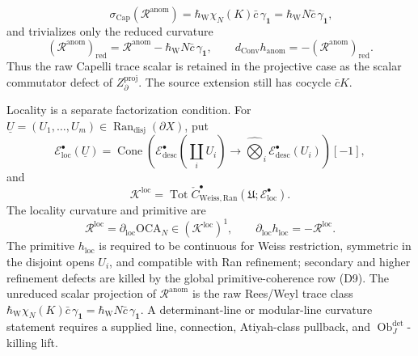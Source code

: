 \begin{defn}
\begin{enumerate}[label=\textup{(D\arabic*)}]
\[      \qquad
      \sigma_{\mathrm{Cap}}(\mathcal R^{\mathrm{anom}})
      =
      \hbar_{\mathrm{W}}\chi_N(K)\bar c\,\gamma_{\mathbf1}
      =\hbar_{\mathrm{W}}N\bar c\,\gamma_{\mathbf1},
    \]
    and trivializes only the reduced curvature
    \[
      (\mathcal R^{\mathrm{anom}})_{\mathrm{red}}
      =
      \mathcal R^{\mathrm{anom}}
      -\hbar_{\mathrm{W}}N\bar c\,\gamma_{\mathbf1},
      \qquad
      d_{\mathrm{Conv}}h_{\mathrm{anom}}
      =
      -(\mathcal R^{\mathrm{anom}})_{\mathrm{red}}.
    \]
    Thus the raw Capelli trace scalar is retained in the projective case
    as the scalar commutator defect of \(Z_\partial^{\mathrm{proj}}\).
    The source extension still has cocycle \(\bar cK\).

    Locality is a separate factorization condition.  For
    \(\underline U=(U_1,\ldots,U_m)\in
    \operatorname{Ran}_{\mathrm{disj}}(\partial X)\), put
    \[
      \mathcal E^\bullet_{\mathrm{loc}}(\underline U)
      =
      \operatorname{Cone}\!\left(
      \mathcal E^\bullet_{\mathrm{desc}}(\coprod_iU_i)
      \longrightarrow
      \widehat\bigotimes_i
      \mathcal E^\bullet_{\mathrm{desc}}(U_i)\right)[-1],
    \]
    and
    \[
      \mathcal K^{\mathrm{loc}}
      =
      \operatorname{Tot}\check C^\bullet_{\mathrm{Weiss,Ran}}
      (\mathfrak U;\mathcal E^\bullet_{\mathrm{loc}}).
    \]
    The locality curvature and primitive are
    \[
      \mathcal R^{\mathrm{loc}}
      =
      \partial_{\mathrm{loc}}\mathrm{OCA}_N\in
      (\mathcal K^{\mathrm{loc}})^1,\qquad
      \partial_{\mathrm{loc}}h_{\mathrm{loc}}
      =
      -\mathcal R^{\mathrm{loc}}.
    \]
    The primitive \(h_{\mathrm{loc}}\) is required to be continuous for
    Weiss restriction, symmetric in the disjoint opens \(U_i\), and
    compatible with Ran refinement; secondary and higher refinement
    defects are killed by the global primitive-coherence row
    \textup{(D9)}.  The unreduced scalar projection of
    \(\mathcal R^{\mathrm{anom}}\) is the raw Rees/Weyl trace class
    \(\hbar_{\mathrm{W}}\chi_N(K)\bar c\,\gamma_{\mathbf1}
    =\hbar_{\mathrm{W}}N\bar c\,\gamma_{\mathbf1}\).  A
    determinant-line or modular-line curvature statement requires a
    supplied line, connection, Atiyah-class pullback, and
    \(\operatorname{Ob}^{\det}_J\)-killing lift.


\end{enumerate}
\end{defn}

